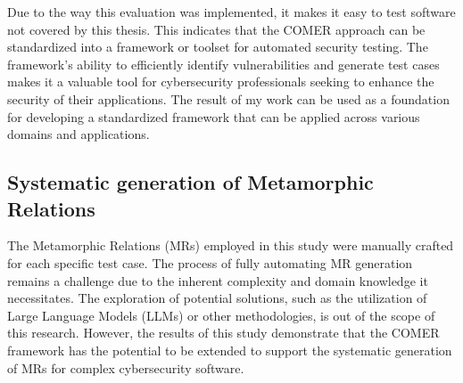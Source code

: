 Due to the way this evaluation was implemented, it makes it easy to test software not covered by this thesis. This indicates that the COMER approach can be standardized into a framework or toolset for automated security testing. The framework's ability to efficiently identify vulnerabilities and generate test cases makes it a valuable tool for cybersecurity professionals seeking to enhance the security of their applications. The result of my work can be used as a foundation for developing a standardized framework that can be applied across various domains and applications.

\subsection{Systematic generation of Metamorphic Relations}

The Metamorphic Relations (MRs) employed in this study were manually crafted for each specific test case. The process of fully automating MR generation remains a challenge due to the inherent complexity and domain knowledge it necessitates. The exploration of potential solutions, such as the utilization of Large Language Models (LLMs) or other methodologies, is out of the scope of this research. However, the results of this study demonstrate that the COMER framework has the potential to be extended to support the systematic generation of MRs for complex cybersecurity software.

